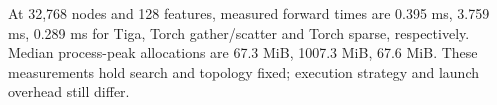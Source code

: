 At 32,768 nodes and 128 features, measured forward times are 0.395 ms, 3.759 ms, 0.289 ms for Tiga, Torch gather/scatter and Torch sparse, respectively. Median process-peak allocations are 67.3 MiB, 1007.3 MiB, 67.6 MiB. These measurements hold search and topology fixed; execution strategy and launch overhead still differ.
